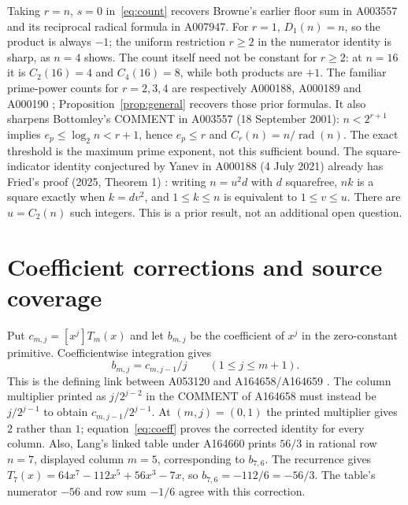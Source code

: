 \documentclass[11pt]{article}
\newcommand{\rad}{\operatorname{rad}}
\begin{document}
Taking $r=n$, $s=0$ in~\eqref{eq:count} recovers Browne's earlier
floor sum in A003557 and its reciprocal radical formula in A007947.
For $r=1$, $D_1(n)=n$, so the product is always $-1$; the uniform
restriction $r\ge2$ in the numerator identity is sharp, as $n=4$ shows.
The count itself need not be constant for $r\ge2$: at $n=16$ it is
$C_2(16)=4$ and $C_4(16)=8$, while both products are $+1$.
The familiar prime-power counts for $r=2,3,4$ are respectively A000188,
A000189 and A000190 \cite{roots}; Proposition~\ref{prop:general}
recovers those prior formulas.
It also sharpens Bottomley's COMMENT in A003557 (18 September 2001):
$n<2^{r+1}$ implies $e_p\le\log_2 n<r+1$, hence $e_p\le r$ and
$C_r(n)=n/\rad(n)$. The exact threshold is the maximum prime exponent,
not this sufficient bound.
The square-indicator identity conjectured by Yanev in A000188
(4 July 2021) already has Fried's proof (2025, Theorem 1) \cite{fried}:
writing $n=u^2d$ with $d$ squarefree, $nk$ is a square exactly when
$k=dv^2$, and $1\le k\le n$ is equivalent to $1\le v\le u$.
There are $u=C_2(n)$ such integers. This is a prior result, not an
additional open question.

\section{Coefficient corrections and source coverage}
Put $c_{m,j}=[x^j]T_m(x)$ and let $b_{m,j}$ be the coefficient of $x^j$
in the zero-constant primitive. Coefficientwise integration gives
\begin{equation}\label{eq:coeff}
 b_{m,j}=c_{m,j-1}/j\qquad(1\le j\le m+1).
\end{equation}
This is the defining link between A053120 and A164658/A164659
\cite{oeis53120,oeis658,oeis659}.
The column multiplier printed as $j/2^{j-2}$ in the COMMENT of A164658
must instead be $j/2^{j-1}$ to obtain $c_{m,j-1}/2^{j-1}$.
At $(m,j)=(0,1)$ the printed multiplier gives $2$ rather than $1$;
equation~\eqref{eq:coeff} proves the corrected identity for every column.
Also, Lang's linked table under A164660 prints $56/3$ in rational row
$n=7$, displayed column $m=5$, corresponding to $b_{7,6}$.
The recurrence gives
$T_7(x)=64x^7-112x^5+56x^3-7x$, so
$b_{7,6}=-112/6=-56/3$.
The table's numerator $-56$ and row sum $-1/6$ agree with this correction.
\end{document}
